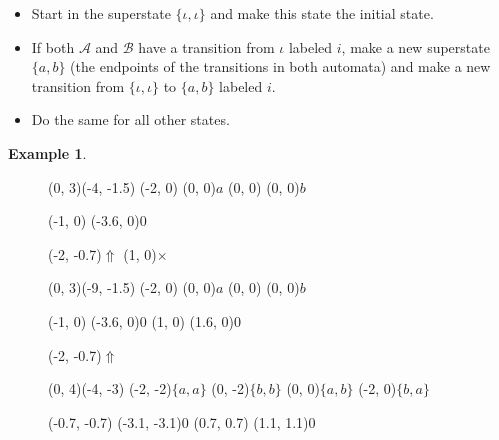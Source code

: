 \documentclass{article}
\theoremstyle{definition}
\newtheorem{example}[theorem]{Example}
\begin{document}
\begin{itemize}
\item Start in the superstate $\{\iota, \iota\}$ and make this state the 
      initial state.
\item If both $\mathcal{A}$ and $\mathcal{B}$ have a transition from $\iota$ 
      labeled $i$, make a new superstate $\{a, b\}$ (the endpoints of the 
      transitions in both automata) and make a new transition from 
      $\{\iota, \iota\}$ to $\{a, b\}$ labeled $i$.
\item Do the same for all other states.
\end{itemize}

\begin{example}
\begin{figure}[H]
\begin{graph}(0, 3)(-4, -1.5)
  (-2, 0) (0, 0){$a$}
  (0, 0)  (0, 0){$b$}

  (-1, 0) \freetext(-3.6, 0){0}
   
   

  \freetext(-2, -0.7){$\Uparrow$}
  \freetext(1, 0){$\times$}
\end{graph}
\begin{graph}(0, 3)(-9, -1.5)
  (-2, 0) (0, 0){$a$}
  (0, 0)  (0, 0){$b$}

  (-1, 0) \freetext(-3.6, 0){0}
   
   
  (1, 0) \freetext(1.6, 0){0}

  \freetext(-2, -0.7){$\Uparrow$}
\end{graph}

\begin{graph}(0, 4)(-4, -3)
  (-2, -2){$\{a, a\}$}
  (0, -2){$\{b, b\}$}
  (0, 0){$\{a, b\}$}
  (-2, 0){$\{b, a\}$}

  (-0.7, -0.7) \freetext(-3.1, -3.1){0}
   
   
  (0.7, 0.7) \freetext(1.1, 1.1){0}
   
   


\end{graph}
\end{figure}
\end{example}
\end{document}
